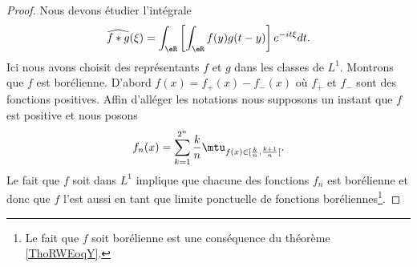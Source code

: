 \begin{proof}
    Nous devons étudier l'intégrale
    \begin{equation}
        \widehat{f*g}(\xi)=\int_{\eR}\left[ \int_{\eR} f(y)g(t-y)\right] e^{-it\xi} dt.
    \end{equation}
    Ici nous avons choisit des représentants \( f\) et \( g\) dans les classes de \( L^1\). Montrons que \( f\) est borélienne. D'abord \( f(x)=f_+(x)-f_-(x)\) où \( f_+\) et \( f_-\) sont des fonctions positives. Affin d'alléger les notations nous supposons un instant que \( f\) est positive et nous posons
    \begin{equation}
        f_n(x)=\sum_{k=1}^{2^n} \frac{ k }{ n }\mtu_{f(x)\in\mathopen[ \frac{ k }{ n } , \frac{ k+1 }{ n } [}.
    \end{equation}
    Le fait que \( f\) soit dans \( L^1\) implique que chacune des fonctions \( f_n\) est borélienne et donc que \( f\) l'est aussi en tant que limite ponctuelle de fonctions boréliennes\footnote{Le fait que \( f\) soit borélienne est une conséquence du théorème \ref{ThoRWEoqY}.}.
    

\end{proof}
